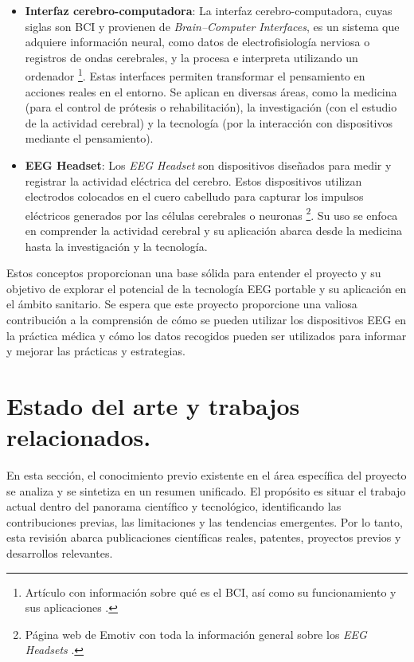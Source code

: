 \begin{itemize}
    \item \textbf{Interfaz cerebro-computadora}: La interfaz cerebro-computadora, cuyas siglas son BCI y provienen de \textit{Brain–Computer Interfaces}, es un sistema que adquiere información neural, como datos de electrofisiología nerviosa o registros de ondas cerebrales, y la procesa e interpreta utilizando un ordenador \cite{InterfazBCI}\footnote{Artículo con información sobre qué es el BCI, así como su funcionamiento y sus aplicaciones \cite{InterfazBCI}.}. Estas interfaces permiten transformar el pensamiento en acciones reales en el entorno. Se aplican en diversas áreas, como la medicina (para el control de prótesis o rehabilitación), la investigación (con el estudio de la actividad cerebral) y la tecnología (por la interacción con dispositivos mediante el pensamiento).
    \item \textbf{EEG Headset}: Los \textit{EEG Headset} son dispositivos diseñados para medir y registrar la actividad eléctrica del cerebro. Estos dispositivos utilizan electrodos colocados en el cuero cabelludo para capturar los impulsos eléctricos generados por las células cerebrales o neuronas \cite{EEGHeadset}\footnote{Página web de Emotiv con toda la información general sobre los \textit{EEG Headsets} \cite{EEGHeadset}.}. Su uso se enfoca en comprender la actividad cerebral y su aplicación abarca desde la medicina hasta la investigación y la tecnología.
\end{itemize}
Estos conceptos proporcionan una base sólida para entender el proyecto y su objetivo de explorar el potencial de la tecnología EEG portable y su aplicación en el ámbito sanitario. Se espera que este proyecto proporcione una valiosa contribución a la comprensión de cómo se pueden utilizar los dispositivos EEG en la práctica médica y cómo los datos recogidos pueden ser utilizados para informar y mejorar las prácticas y estrategias.

\section{Estado del arte y trabajos relacionados.}
En esta sección, el conocimiento previo existente en el área específica del proyecto se analiza y se sintetiza en un resumen unificado. El propósito es situar el trabajo actual dentro del panorama científico y tecnológico, identificando las contribuciones previas, las limitaciones y las tendencias emergentes.
Por lo tanto, esta revisión abarca publicaciones científicas reales, patentes, proyectos previos y desarrollos relevantes.

